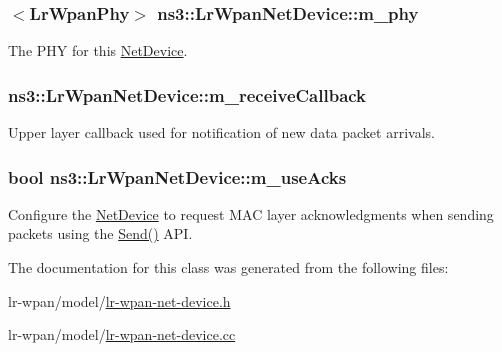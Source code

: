 \subsubsection[{\texorpdfstring{m\+\_\+phy}{m_phy}}]{$<${\bf Lr\+Wpan\+Phy}$>$ ns3\+::\+Lr\+Wpan\+Net\+Device\+::m\+\_\+phy\hspace{0.3cm}{\ttfamily [private]}}\hypertarget{classns3_1_1LrWpanNetDevice_a78e6e248b53fe535e3a02c58615522a6}{}\label{classns3_1_1LrWpanNetDevice_a78e6e248b53fe535e3a02c58615522a6}
The P\+HY for this \hyperlink{classns3_1_1NetDevice}{Net\+Device}. 
\subsubsection[{\texorpdfstring{m\+\_\+receive\+Callback}{m_receiveCallback}}]{ ns3\+::\+Lr\+Wpan\+Net\+Device\+::m\+\_\+receive\+Callback\hspace{0.3cm}{\ttfamily [private]}}\hypertarget{classns3_1_1LrWpanNetDevice_a6233bbfe4654d619c87ab406f05a39fe}{}\label{classns3_1_1LrWpanNetDevice_a6233bbfe4654d619c87ab406f05a39fe}
Upper layer callback used for notification of new data packet arrivals. 
\subsubsection[{\texorpdfstring{m\+\_\+use\+Acks}{m_useAcks}}]{\setlength{\rightskip}{0pt plus 5cm}bool ns3\+::\+Lr\+Wpan\+Net\+Device\+::m\+\_\+use\+Acks\hspace{0.3cm}{\ttfamily [private]}}\hypertarget{classns3_1_1LrWpanNetDevice_a2e9f71d0b393e1d0030869b2bd7b2ab8}{}\label{classns3_1_1LrWpanNetDevice_a2e9f71d0b393e1d0030869b2bd7b2ab8}
Configure the \hyperlink{classns3_1_1NetDevice}{Net\+Device} to request M\+AC layer acknowledgments when sending packets using the \hyperlink{classns3_1_1LrWpanNetDevice_a76722847d2ca57ded0e97e1256fe0356}{Send()} A\+PI. 

The documentation for this class was generated from the following files\+:\begin{DoxyCompactItemize}
\item 
lr-\/wpan/model/\hyperlink{lr-wpan-net-device_8h}{lr-\/wpan-\/net-\/device.\+h}\item 
lr-\/wpan/model/\hyperlink{lr-wpan-net-device_8cc}{lr-\/wpan-\/net-\/device.\+cc}\end{DoxyCompactItemize}

